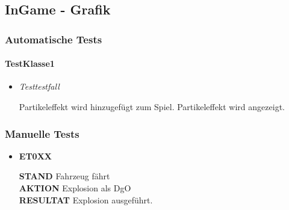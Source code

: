 \subsection{InGame - Grafik}

\subsubsection{Automatische Tests}
\paragraph{TestKlasse1}
\begin{itemize}
    \item \textit{Testtestfall}
        \begin{leftbar}[0.9\linewidth]
			Partikeleffekt wird hinzugefügt zum Spiel.
			Partikeleffekt wird angezeigt.
        \end{leftbar}
\end{itemize}

\subsubsection{Manuelle Tests}
	\begin{itemize} [label={}]
		\item \textbf{ET0XX}\par 
			\textbf{STAND} Fahrzeug fährt\\
			\textbf{AKTION} Explosion als DgO\\
            \textbf{RESULTAT} Explosion ausgeführt.\\\par
            
       

	\end{itemize}

